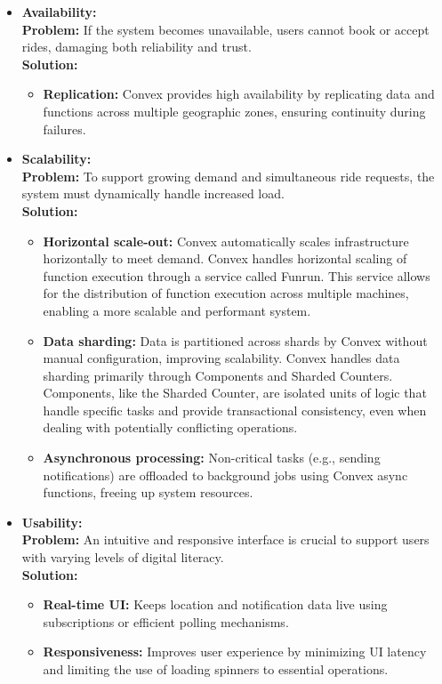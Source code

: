 \documentclass[12pt]{article}
\begin{document}
\begin{itemize}
  \item \textbf{Availability:} \\
  \textbf{Problem:} If the system becomes unavailable, users cannot book or accept rides, damaging both reliability and trust. \\
  \textbf{Solution:} 
  \begin{itemize}
    \item \textbf{Replication:} Convex provides high availability by replicating data and functions across multiple geographic zones, ensuring continuity during failures.
  \end{itemize}
  
  \item \textbf{Scalability:} \\
  \textbf{Problem:} To support growing demand and simultaneous ride requests, the system must dynamically handle increased load. \\
  \textbf{Solution:} 
  \begin{itemize}
    \item \textbf{Horizontal scale-out:} Convex automatically scales infrastructure horizontally to meet demand. Convex handles horizontal scaling of function execution through a service called Funrun. This service allows for the distribution of function execution across multiple machines, enabling a more scalable and performant system.
    \item \textbf{Data sharding:} Data is partitioned across shards by Convex without manual configuration, improving scalability. Convex handles data sharding primarily through Components and Sharded Counters. Components, like the Sharded Counter, are isolated units of logic that handle specific tasks and provide transactional consistency, even when dealing with potentially conflicting operations.
    \item \textbf{Asynchronous processing:} Non-critical tasks (e.g., sending notifications) are offloaded to background jobs using Convex async functions, freeing up system resources.
  \end{itemize}

  \item \textbf{Usability:} \\
  \textbf{Problem:} An intuitive and responsive interface is crucial to support users with varying levels of digital literacy. \\
  \textbf{Solution:} 
  \begin{itemize}
    \item \textbf{Real-time UI:} Keeps location and notification data live using subscriptions or efficient polling mechanisms.
    \item \textbf{Responsiveness:} Improves user experience by minimizing UI latency and limiting the use of loading spinners to essential operations.
  \end{itemize}


\end{itemize}
\end{document}

